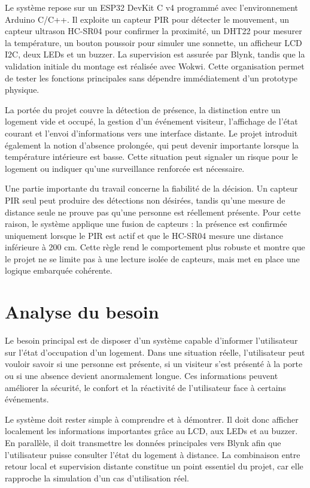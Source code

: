 \documentclass[12pt,a4paper]{report}
\begin{document}
Le système repose sur un ESP32 DevKit C v4 programmé avec l'environnement Arduino C/C++. Il exploite un capteur PIR pour détecter le mouvement, un capteur ultrason HC-SR04 pour confirmer la proximité, un DHT22 pour mesurer la température, un bouton poussoir pour simuler une sonnette, un afficheur LCD I2C, deux LEDs et un buzzer. La supervision est assurée par Blynk, tandis que la validation initiale du montage est réalisée avec Wokwi. Cette organisation permet de tester les fonctions principales sans dépendre immédiatement d'un prototype physique.

La portée du projet couvre la détection de présence, la distinction entre un logement vide et occupé, la gestion d'un événement visiteur, l'affichage de l'état courant et l'envoi d'informations vers une interface distante. Le projet introduit également la notion d'absence prolongée, qui peut devenir importante lorsque la température intérieure est basse. Cette situation peut signaler un risque pour le logement ou indiquer qu'une surveillance renforcée est nécessaire.

Une partie importante du travail concerne la fiabilité de la décision. Un capteur PIR seul peut produire des détections non désirées, tandis qu'une mesure de distance seule ne prouve pas qu'une personne est réellement présente. Pour cette raison, le système applique une fusion de capteurs : la présence est confirmée uniquement lorsque le PIR est actif et que le HC-SR04 mesure une distance inférieure à 200 cm. Cette règle rend le comportement plus robuste et montre que le projet ne se limite pas à une lecture isolée de capteurs, mais met en place une logique embarquée cohérente.

\chapter{Analyse du besoin}
Le besoin principal est de disposer d'un système capable d'informer l'utilisateur sur l'état d'occupation d'un logement. Dans une situation réelle, l'utilisateur peut vouloir savoir si une personne est présente, si un visiteur s'est présenté à la porte ou si une absence devient anormalement longue. Ces informations peuvent améliorer la sécurité, le confort et la réactivité de l'utilisateur face à certains événements.

Le système doit rester simple à comprendre et à démontrer. Il doit donc afficher localement les informations importantes grâce au LCD, aux LEDs et au buzzer. En parallèle, il doit transmettre les données principales vers Blynk afin que l'utilisateur puisse consulter l'état du logement à distance. La combinaison entre retour local et supervision distante constitue un point essentiel du projet, car elle rapproche la simulation d'un cas d'utilisation réel.
\end{document}
